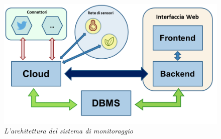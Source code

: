 \begin{figure}[h]
\centering
\includegraphics[width=\textwidth]{immagini/cloud.png}
\caption{\textit{L'architettura del sistema di monitoraggio}}
\end{figure}

